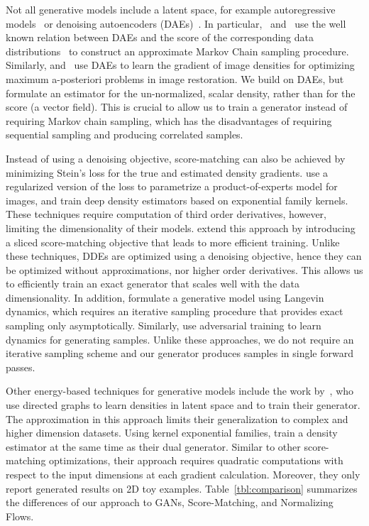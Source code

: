 \documentclass{article}
\begin{document}
Not all generative models include a latent space, for example autoregressive models~\citep{Oord2016PCNN} or denoising autoencoders (DAEs)~\citep{JMLR:v15:alain14a}. In particular,~\citet{JMLR:v15:alain14a} and~\citet{Saremi2019NeuralEB} use the well known relation between DAEs and the score of the corresponding data distributions~\citep{Vincent:2011:CSM,Raphan:2011:LSE} to construct an approximate Markov Chain sampling procedure.
Similarly, \citet{bigdeli2017image} and~\citet{bigdeli2017deep} use DAEs to learn the gradient of image densities for optimizing maximum a-posteriori problems in image restoration.
We build on DAEs, but formulate an estimator for the un-normalized, scalar density, rather than for the score (a vector field). This is crucial to allow us to train a generator instead of requiring Markov chain sampling, which has the disadvantages of requiring sequential sampling and producing correlated samples.

Instead of using a denoising objective, score-matching can also be achieved by minimizing Stein's loss for the true and estimated density gradients.
\citet{kingma2010regularized} use a regularized version of the loss to parametrize a product-of-experts model for images, and
\citet{li2019learning} train deep density estimators based on exponential family kernels.
These techniques require computation of third order derivatives, however, limiting the dimensionality of their models.
\citet{Song2019GMG} extend this approach by introducing a sliced score-matching objective that leads to more efficient training.
Unlike these techniques, DDEs are optimized using a denoising objective, hence they can be optimized without approximations, nor higher order derivatives. This allows us to efficiently train an exact generator that scales well with the data dimensionality.
In addition, \citet{Song2019GMG} formulate a generative model using Langevin dynamics,
which requires an iterative sampling procedure that provides exact sampling only asymptotically.
Similarly, \citet{dai2019exponential} use adversarial training to learn dynamics for generating samples.
Unlike these approaches, we do not require an iterative sampling scheme and our generator produces samples in single forward passes.

Other energy-based techniques for generative models include the work by~\citet{kim2016deep}, who use directed graphs to learn densities in latent space and to train their generator.
The approximation in this approach limits their generalization to complex and higher dimension datasets.
Using kernel exponential families, \citet{dai2019kernel} train a density estimator at the same time as their dual generator.
Similar to other score-matching optimizations, their approach requires quadratic computations with respect to the input dimensions at each gradient calculation.
Moreover, they only report generated results on 2D toy examples.
Table~\ref{tbl:comparison} summarizes the differences of our approach to GANs, Score-Matching, and Normalizing Flows.
\end{document}
